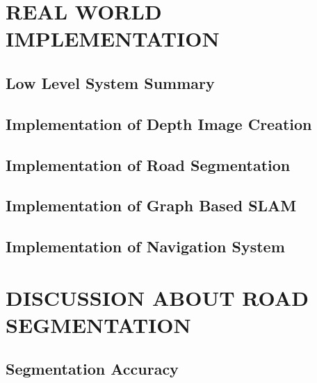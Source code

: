 

\chapter{REAL WORLD IMPLEMENTATION}
\label{sec:chap4_result1}
\section*{ }

\section{Low Level System Summary}
\LowLevelSystemSummary
\section{Implementation of Depth Image Creation}
\ImplementationofDepthImageCreation
\section{Implementation of Road Segmentation}
\ImplementationofRoadSegmentation
\section{Implementation of Graph Based SLAM}
\ImplementationofGraphBasedSLAM
\section{Implementation of Navigation System}
\ImplementationofNavigationSystem

\chapter{DISCUSSION ABOUT ROAD SEGMENTATION}
\label{sec:chap4_result2}
\section*{ }

\section{Segmentation Accuracy}
\SegmentationAccuracy
